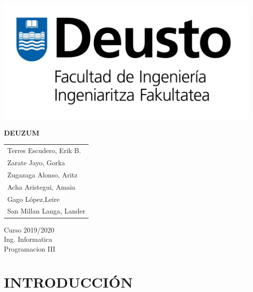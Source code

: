 \documentclass{article}
\theoremstyle{definition}
\begin{document}
\begin{titlepage}
	\begin{center}
	    \includegraphics[scale = 0.5]{LogoIngenieriaR.jpg}\\[1.0 cm]
	\end{center}
	
    \vspace*{150pt}
    \centering
    {\Huge
     \textbf{DEUZUM}
    }
    
	\vspace*{200pt}
	
	
	\begin{minipage}{2in}
		\begin{tabular}{l}
			Terres Escudero, Erik B.    \\
			Zarate Jayo, Gorka   \\
			Zugazaga Alonso, Aritz  \\
			Acha Aristegui, Amaia  \\
			Gago López,Leire  \\
			San Millan Langa, Lander 
		\end{tabular}
	\end{minipage}
	\hfill
	\begin{minipage}{3in}
	\begin{flushright}
	\Large Curso 2019/2020 \\
		\Huge Ing. Informatica\\
		\LARGE Programacion III
	\end{flushright}
		
	\end{minipage}


    
	
\end{titlepage}

\tableofcontents

\clearpage

\section{INTRODUCCIÓN}
\end{document}
